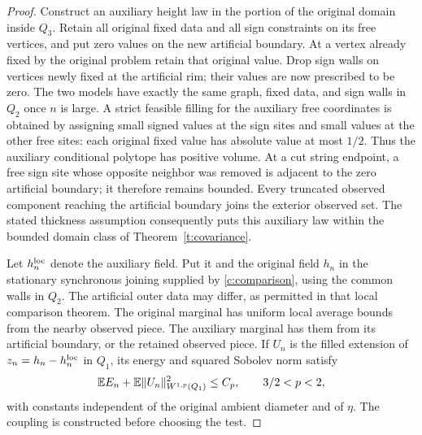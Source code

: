 \begin{proof}
Construct an auxiliary height law in the portion of the original domain
inside $Q_3$.  Retain all original fixed data and all sign constraints
on its free vertices, and put zero values on the new artificial
boundary.  At a vertex already fixed by the original problem retain
that original value.  Drop sign walls on vertices newly fixed at the
artificial rim; their values are now prescribed to be zero.  The two
models have exactly the same graph,
fixed data, and sign walls in $Q_2$ once $n$ is large.  A strict feasible
filling for the auxiliary free coordinates is obtained by assigning
small signed values at the sign sites and small values at the other
free sites: each original fixed value has absolute value at most $1/2$.
Thus the auxiliary conditional polytope has positive volume.  At a cut
string endpoint, a free sign site whose opposite neighbor was removed
is adjacent to the zero artificial boundary; it therefore remains
bounded.  Every truncated observed component reaching the artificial
boundary joins the exterior observed set.  The stated thickness
assumption consequently puts this auxiliary law within the bounded
domain class of Theorem~\ref{t:covariance}.

Let $h_n^{\rm loc}$ denote the auxiliary field.  Put it and the original
field $h_n$ in the stationary synchronous joining supplied by
\ref{c:comparison}, using the common walls in $Q_2$.  The artificial
outer data may differ, as permitted in that local comparison theorem.
The original marginal has uniform local average bounds from the nearby
observed piece.  The auxiliary marginal has them from its artificial
boundary, or the retained observed piece.  If $U_n$ is the filled extension of
$z_n=h_n-h_n^{\rm loc}$ in $Q_1$, its energy and squared Sobolev norm
satisfy
\begin{equation}\label{t:local-difference-energy}
 \mathbb E E_n+\mathbb E\|U_n\|_{W^{1,p}(Q_1)}^2\le C_p,
 \qquad 3/2<p<2,
\end{equation}
with constants independent of the original ambient diameter and of
$\eta$.  The coupling is constructed before choosing the test.


\end{proof}

